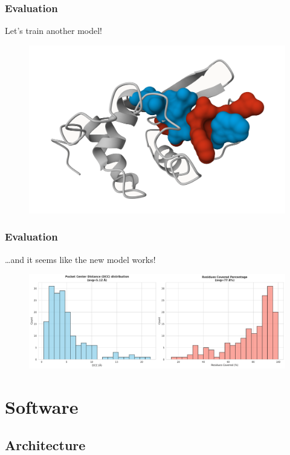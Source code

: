 \documentclass[aspectratio=169]{beamer}
\begin{document}
\begin{frame}
  \frametitle{Evaluation}

  Let's train another model!

  \begin{figure}
    \centering
    \includegraphics[width=\linewidth,height=0.8\textheight,keepaspectratio]{fig/smoothing-difference.png}
  \end{figure}
\end{frame}

\begin{frame}
  \frametitle{Evaluation}

  \dots and it seems like the new model works!

  \begin{figure}
    \includegraphics[width=\textwidth]{fig/smoothened-1.pdf}
  \end{figure}
\end{frame}

\section{Software}

\subsection{Architecture}
\end{document}
